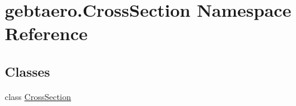 \hypertarget{namespacegebtaero_1_1_cross_section}{}\section{gebtaero.\+Cross\+Section Namespace Reference}
\label{namespacegebtaero_1_1_cross_section}
\subsection*{Classes}
\begin{DoxyCompactItemize}
\item 
class \hyperlink{classgebtaero_1_1_cross_section_1_1_cross_section}{Cross\+Section}
\end{DoxyCompactItemize}
